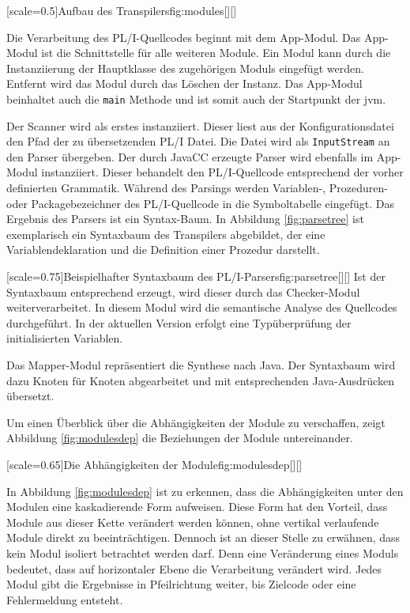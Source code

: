 [scale=0.5]{Aufbau des Transpilers}{fig:modules}[][]

Die Verarbeitung des PL/I-Quellcodes beginnt mit dem App-Modul. Das App-Modul ist die Schnittstelle für alle weiteren Module. Ein Modul kann durch die Instanziierung der Hauptklasse des zugehörigen Moduls eingefügt werden. Entfernt wird das Modul durch das Löschen der Instanz. Das App-Modul beinhaltet auch die \verb+main+ Methode und ist somit auch der Startpunkt der \ac{jvm}.

Der Scanner wird als erstes instanziiert. Dieser liest aus der Konfigurationsdatei den Pfad der zu übersetzenden PL/I Datei. Die Datei wird als \verb+InputStream+ an den Parser übergeben.
Der durch JavaCC erzeugte Parser wird ebenfalls im App-Modul instanziiert. Dieser behandelt den PL/I-Quellcode entsprechend der vorher definierten Grammatik.  Während des Parsings werden Variablen-, Prozeduren- oder Packagebezeichner des PL/I-Quellcode in die Symboltabelle eingefügt. Das Ergebnis des Parsers ist ein Syntax-Baum. 
In Abbildung \ref{fig:parsetree} ist exemplarisch ein Syntaxbaum des Transpilers abgebildet, der eine Variablendeklaration und die Definition einer Prozedur darstellt.

[scale=0.75]{Beispielhafter Syntaxbaum des PL/I-Parsers}{fig:parsetree}[][]
\pagebreak
Ist der Syntaxbaum entsprechend erzeugt, wird dieser durch das Checker-Modul weiterverarbeitet. In diesem Modul wird die semantische Analyse des Quellcodes durchgeführt. In der aktuellen Version erfolgt eine Typüberprüfung der initialisierten Variablen.

Das Mapper-Modul repräsentiert die Synthese nach Java. Der Syntaxbaum wird dazu Knoten für Knoten abgearbeitet und mit entsprechenden Java-Ausdrücken übersetzt.

Um einen Überblick über die Abhängigkeiten der Module zu verschaffen, zeigt
Abbildung \ref{fig:modulesdep} die Beziehungen der Module untereinander.

[scale=0.65]{Die Abhängigkeiten der Module}{fig:modulesdep}[][]


In Abbildung \ref{fig:modulesdep} ist zu erkennen, dass die Abhängigkeiten unter den Modulen eine kaskadierende Form aufweisen. Diese Form hat den Vorteil, dass Module aus dieser Kette verändert werden können, ohne vertikal verlaufende Module direkt zu beeinträchtigen. Dennoch ist an dieser Stelle zu erwähnen, dass kein Modul isoliert betrachtet werden darf. Denn eine Veränderung eines Moduls bedeutet, dass auf horizontaler Ebene die Verarbeitung verändert wird. Jedes Modul gibt die Ergebnisse in Pfeilrichtung weiter, bis Zielcode oder eine Fehlermeldung entsteht.

